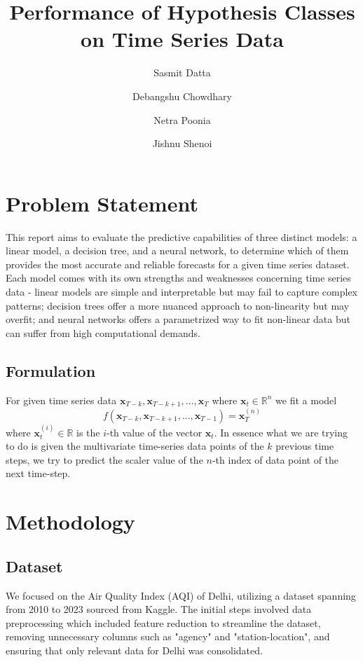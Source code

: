 \documentclass[12pt,a4paper]{article}
\title{\textbf{Performance of Hypothesis Classes on Time Series Data}}
\author{
  Sasmit Datta\and
  Debangshu Chowdhary\and
  Netra Poonia\and
  Jishnu Shenoi
}
\date{}
\begin{document}
\maketitle

\section{Problem Statement}
This report aims to evaluate the predictive capabilities of three distinct models: a linear model, a decision tree, and a neural network, to determine which of them provides the most accurate and reliable forecasts for a given time series dataset. Each model comes with its own strengths and weaknesses concerning time series data - linear models are simple and interpretable but may fail to capture complex patterns; decision trees offer a more nuanced approach to non-linearity but may overfit; and neural networks offers a parametrized way to fit non-linear data but can suffer from high computational demands.
\subsection{Formulation}
For given time series data $\mathbf{x}_{T-k},\mathbf{x}_{T-k+1},\hdots,\mathbf{x}_{T}$ where $\mathbf{x}_t\in \mathbb{R}^n$ we fit a model 
\begin{equation}
f(\mathbf{x}_{T-k},\mathbf{x}_{T-k+1},...,\mathbf{x}_{T-1}) = \mathbf{x}_{T}^{(n)}
\end{equation}
where $\mathbf{x}_{t}^{(i)}\in \mathbb{R}$ is the $i$-th value of the vector $\mathbf{x}_{t}$. In essence what we are trying to do is given the multivariate time-series data points of the $k$ previous time steps, we try to predict the scaler value of the $n$-th index of data point of the next time-step.

\section{Methodology}

\subsection{Dataset}
We focused on the Air Quality Index (AQI) of Delhi, utilizing a dataset spanning from 2010 to 2023 sourced from Kaggle. The initial steps involved data preprocessing which included feature reduction to streamline the dataset, removing unnecessary columns such as "agency" and "station-location", and ensuring that only relevant data for Delhi was consolidated.
\end{document}
